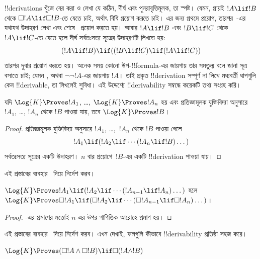 \documentclass[../../../include/open-logic-section]{subfiles}
\begin{document}


!!{derivation}s খুঁজে বের করা ও লেখা যে কঠিন, দীর্ঘ এবং পুনরাবৃত্তিমূলক, তা স্পষ্ট। যেমন, প্রায়ই $!A \lif !B$ থেকে $\Box !A \lif \Box !B$-তে যেতে চাই, অর্থাৎ \RK{} বিধি প্রয়োগ করতে চাই। এর জন্য প্রথমে \Nec{} প্রয়োগ, তারপর~-এর যথাযথ উদাহরণ লেখা এবং শেষে~\MP{} প্রয়োগ করতে হয়। আবার $!A \lif !B$ এবং $!B \lif !C$ থেকে $!A \lif !C$-তে যেতে হলে দীর্ঘ সর্বতঃসত্য সূত্রের উদাহরণটি লিখতে হয়:
\[
(!A \lif !B) \lif ((!B \lif !C) \lif (!A \lif !C))
\]
তারপর \MP{} দুবার প্রয়োগ করতে হয়। অনেক সময় কোনো উপ-!!{formula}-এর জায়গায় তার সমতুল্য বলে জানা সূত্র বসাতে চাই; যেমন , অথবা $\lnot\lnot !A$-এর জায়গায় $!A$। তাই প্রকৃত !!{derivation} সম্পূর্ণ না লিখে মধ্যবর্তী ধাপগুলি কেন !!{derivable}, তা লিখলেই সুবিধা। এই উদ্দেশ্যে !!{derivability} সম্বন্ধে কয়েকটি তথ্য সংগ্রহ করি।

\begin{prop}
  যদি $\Log{K} \Proves !A_1$, \dots, $\Log{K} \Proves !A_n$ হয় এবং প্রতিজ্ঞামূলক যুক্তিবিদ্যা অনুসারে $!A_1$, \dots, $!A_n$ থেকে $!B$ পাওয়া যায়, তবে $\Log{K} \Proves !B$।
\end{prop}

\begin{proof}
  প্রতিজ্ঞামূলক যুক্তিবিদ্যা অনুসারে $!A_1$, \dots,~$!A_n$ থেকে $!B$ পাওয়া গেলে
  \[
  !A_1 \lif (!A_2 \lif \cdots (!A_n \lif !B)\dots)
  \]
  সর্বতঃসত্য সূত্রের একটি উদাহরণ। \MP{} $n$ বার প্রয়োগে~$!B$-এর একটি !!{derivation} পাওয়া যায়।
\end{proof}

এই প্রস্তাবের ব্যবহার~\PL{} দিয়ে নির্দেশ করব।

\begin{prop}
  $\Log{K} \Proves !A_1 \lif (!A_2 \lif \cdots (!A_{n-1} \lif
  !A_n)\dots)$ হলে $\Log{K} \Proves \Box !A_1 \lif (\Box !A_2 \lif
  \cdots (\Box !A_{n-1} \lif \Box !A_n)\dots)$।
\end{prop}

\begin{proof}
  -এর প্রমাণের মতোই $n$-এর উপর গাণিতিক আরোহে প্রমাণ হয়।
\end{proof}

এই প্রস্তাবের ব্যবহার~\RK{} দিয়ে নির্দেশ করব। এখন দেখাই, ফলগুলি কীভাবে !!{derivability} প্রতিষ্ঠা সহজ করে।

\begin{prop}
  $\Log{K} \Proves (\Box!A \land \Box!B) \lif \Box (!A \land !B)$
\end{prop}
\end{document}
